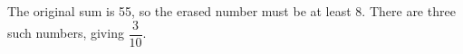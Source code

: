 The original sum is 55, so the erased number must be at least 8. There are three such numbers, giving $\boxed{\dfrac{3}{10}}$.
